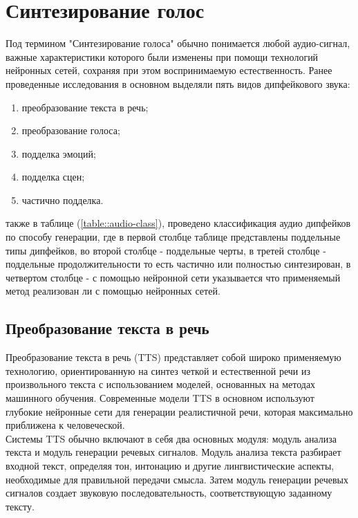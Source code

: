 \chapter{Синтезирование голос}

Под термином "Синтезирование голоса" обычно понимается любой аудио-сигнал, важные характеристики которого были изменены при помощи технологий нейронных сетей, сохраняя при этом воспринимаемую естественность. Ранее проведенные исследования в основном выделяли пять видов дипфейкового звука:

\begin{enumerate}
    \item преобразование текста в речь;
    \item преобразование голоса; 
    \item подделка эмоций;
    \item подделка сцен;
    \item частично подделка.
\end{enumerate}

также в таблице (\ref{table::audio-class}), проведено классификация аудио дипфейков по способу генерации, где в первой столбце таблице представлены поддельные типы дипфейков, во второй столбце - поддельные черты, в третей столбце - поддельные продолжительности то есть частично или полностью синтезирован, в четвертом столбце - с помощью нейронной сети указывается что применяемый метод реализован ли с помощью нейронных сетей.

\section{Преобразование текста в речь}

Преобразование текста в речь (TTS) представляет собой широко применяемую технологию, ориентированную на синтез четкой и естественной речи из произвольного текста с использованием моделей, основанных на методах машинного обучения. Современные модели TTS в основном используют глубокие нейронные сети для генерации реалистичной речи, которая максимально приближена к человеческой.\\

Системы TTS обычно включают в себя два основных модуля: модуль анализа текста и модуль генерации речевых сигналов. Модуль анализа текста разбирает входной текст, определяя тон, интонацию и другие лингвистические аспекты, необходимые для правильной передачи смысла. Затем модуль генерации речевых сигналов создает звуковую последовательность, соответствующую заданному тексту.

